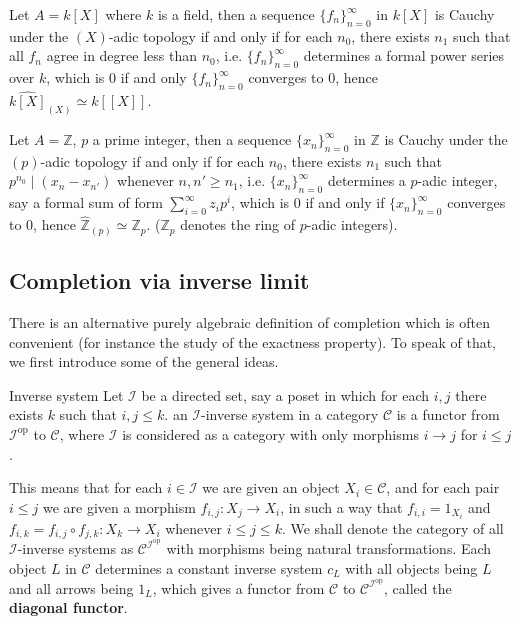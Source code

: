 \documentclass[10pt]{extarticle}
\begin{document}
\begin{example}
    Let $A=k[X]$ where $k$ is a field, then a sequence $\{f_n\}_{n=0}^\infty$ in $k[X]$ is Cauchy under the $(X)$-adic topology if and only if for each $n_0$, there exists $n_1$ such that all $f_n$ agree in degree less than $n_0$, i.e. $\{f_n\}_{n=0}^\infty$ determines a formal power series over $k$, which is $0$ if and only $\{f_n\}_{n=0}^\infty$ converges to $0$, hence $\widehat{k[X]}_{(X)}\simeq k[[X]]$.
\end{example}

\begin{example}
    Let $A=\mathbb{Z}$, $p$ a prime integer, then a sequence $\{x_n\}_{n=0}^\infty$ in $\mathbb{Z}$ is Cauchy under the $(p)$-adic topology if and only if for each $n_0$, there exists $n_1$ such that $p^{n_0}\mid (x_n-x_{n'})$ whenever $n,n'\geq n_1$, i.e. $\{x_n\}_{n=0}^\infty$ determines a $p$-adic integer, say a formal sum of form $\sum_{i=0}^\infty z_ip^i$, which is $0$ if and only if $\{x_n\}_{n=0}^\infty$ converges to $0$, hence $\widehat{\mathbb{Z}}_{(p)}\simeq \mathbb{Z}_p$. ($\mathbb{Z}_p$ denotes the ring of $p$-adic integers).
\end{example}


\subsection{Completion via inverse limit}

There is an alternative purely algebraic definition of completion which is often convenient (for instance the study of the exactness property). To speak of that, we first introduce some of the general ideas. 

\begin{definition}{Inverse system}{}
    Let $\mathcal{I}$ be a directed set, say a poset in which for each $i,j$ there exists $k$ such that $i,j\leq k$. an $\mathcal{I}$-inverse system in a category $\mathcal{C}$ is a functor from $\mathcal{I}^\text{op}$ to $\mathcal{C}$, where $\mathcal{I}$ is considered as a category with only morphisms $i\to j$ for $i\leq j$.
\end{definition}

This means that for each $i\in\mathcal{I}$ we are given an object $X_i\in\mathcal{C}$, and for each pair $i\leq j$ we are given a morphism $f_{i,j}\colon X_j\to X_i$, in such a way that $f_{i,i}=1_{X_i}$ and $f_{i,k}=f_{i,j}\circ f_{j,k}\colon X_k\to X_i$ whenever $i\leq j\leq k$. We shall denote the category of all $\mathcal{I}$-inverse systems as $\mathcal{C}^{\mathcal{I}^\text{op}}$ with morphisms being natural transformations. Each object $L$ in $\mathcal{C}$ determines a constant inverse system $c_L$ with all objects being $L$ and all arrows being $1_L$, which gives a functor from $\mathcal{C}$ to $\mathcal{C}^{\mathcal{I}^\text{op}}$, called the \textbf{diagonal functor}.
\end{document}
